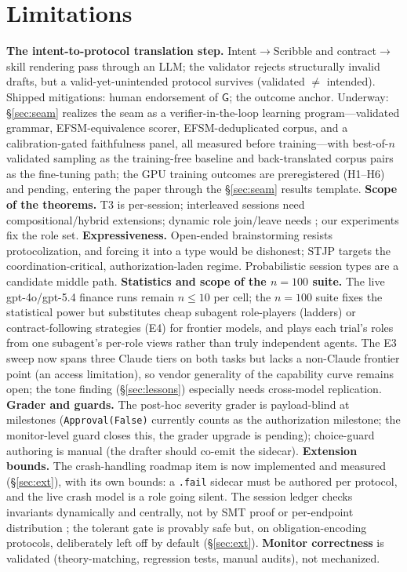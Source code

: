 \documentclass{article}
\newcommand{\gtG}{\mathsf{G}}
\newcommand{\stjp}{\textsc{STJP}}
\begin{document}
\section{Limitations}\label{sec:limits}
\textbf{The intent-to-protocol translation step.} Intent$\to$Scribble and contract$\to$skill rendering pass through an LLM; the validator rejects structurally invalid drafts, but a valid-yet-unintended protocol survives (validated $\neq$ intended). Shipped mitigations: human endorsement of $\gtG$; the outcome anchor. Underway: \S\ref{sec:seam} realizes the seam as a verifier-in-the-loop learning program---validated grammar, EFSM-equivalence scorer, EFSM-deduplicated corpus, and a calibration-gated faithfulness panel, all measured before training---with best-of-$n$ validated sampling as the training-free baseline and back-translated corpus pairs as the fine-tuning path; the GPU training outcomes are preregistered (H1--H6) and pending, entering the paper through the \S\ref{sec:seam} results template. \textbf{Scope of the theorems.} T3 is per-session; interleaved sessions need compositional/hybrid extensions; dynamic role join/leave needs \citep{denielou11}; our experiments fix the role set. \textbf{Expressiveness.} Open-ended brainstorming resists protocolization, and forcing it into a type would be dishonest; \stjp{} targets the coordination-critical, authorization-laden regime. Probabilistic session types are a candidate middle path. \textbf{Statistics and scope of the $n{=}100$ suite.} The live gpt-4o/gpt-5.4 finance runs remain $n\leq10$ per cell; the $n{=}100$ suite fixes the statistical power but substitutes cheap subagent role-players (ladders) or contract-following strategies (E4) for frontier models, and plays each trial's roles from one subagent's per-role views rather than truly independent agents. The E3 sweep now spans three Claude tiers on both tasks but lacks a non-Claude frontier point (an access limitation), so vendor generality of the capability curve remains open; the tone finding (\S\ref{sec:lessons}) especially needs cross-model replication. \textbf{Grader and guards.} The post-hoc severity grader is payload-blind at milestones (\texttt{Approval(False)} currently counts as the authorization milestone; the monitor-level guard closes this, the grader upgrade is pending); choice-guard authoring is manual (the drafter should co-emit the sidecar). \textbf{Extension bounds.} The crash-handling roadmap item is now implemented and measured (\S\ref{sec:ext}), with its own bounds: a \texttt{.fail} sidecar must be authored per protocol, and the live crash model is a role going silent. The session ledger checks invariants dynamically and centrally, not by SMT proof or per-endpoint distribution \citep{chen12}; the tolerant gate is provably safe but, on obligation-encoding protocols, deliberately left off by default (\S\ref{sec:ext}). \textbf{Monitor correctness} is validated (theory-matching, regression tests, manual audits), not mechanized.
\end{document}
